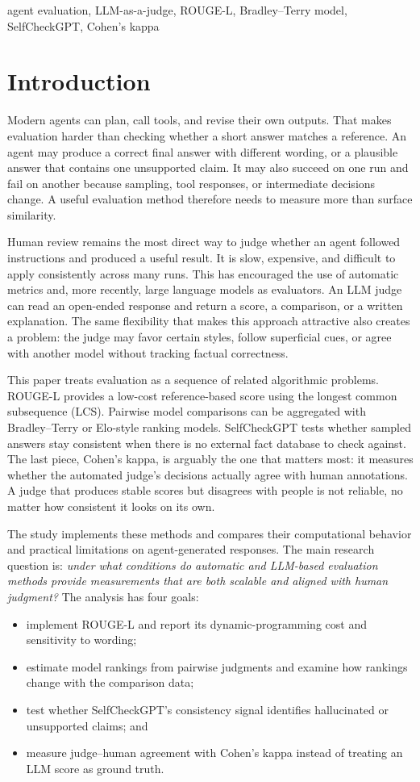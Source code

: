 \documentclass[conference]{IEEEtran}
\begin{document}
\begin{IEEEkeywords}
agent evaluation, LLM-as-a-judge, ROUGE-L, Bradley--Terry model, SelfCheckGPT, Cohen's kappa
\end{IEEEkeywords}

\section{Introduction}
Modern agents can plan, call tools, and revise their own outputs. That makes evaluation harder than checking whether a short answer matches a reference. An agent may produce a correct final answer with different wording, or a plausible answer that contains one unsupported claim. It may also succeed on one run and fail on another because sampling, tool responses, or intermediate decisions change. A useful evaluation method therefore needs to measure more than surface similarity.

Human review remains the most direct way to judge whether an agent followed instructions and produced a useful result. It is slow, expensive, and difficult to apply consistently across many runs. This has encouraged the use of automatic metrics and, more recently, large language models as evaluators. An LLM judge can read an open-ended response and return a score, a comparison, or a written explanation. The same flexibility that makes this approach attractive also creates a problem: the judge may favor certain styles, follow superficial cues, or agree with another model without tracking factual correctness.

This paper treats evaluation as a sequence of related algorithmic problems. ROUGE-L provides a low-cost reference-based score using the longest common subsequence (LCS). Pairwise model comparisons can be aggregated with Bradley--Terry or Elo-style ranking models. SelfCheckGPT tests whether sampled answers stay consistent when there is no external fact database to check against. The last piece, Cohen's kappa, is arguably the one that matters most: it measures whether the automated judge's decisions actually agree with human annotations. A judge that produces stable scores but disagrees with people is not reliable, no matter how consistent it looks on its own.

The study implements these methods and compares their computational behavior and practical limitations on agent-generated responses. The main research question is: \emph{under what conditions do automatic and LLM-based evaluation methods provide measurements that are both scalable and aligned with human judgment?} The analysis has four goals:
\begin{itemize}
\item implement ROUGE-L and report its dynamic-programming cost and sensitivity to wording;
\item estimate model rankings from pairwise judgments and examine how rankings change with the comparison data;
\item test whether SelfCheckGPT's consistency signal identifies hallucinated or unsupported claims; and
\item measure judge--human agreement with Cohen's kappa instead of treating an LLM score as ground truth.
\end{itemize}
\end{document}
